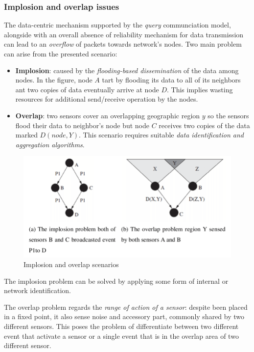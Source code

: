 \documentclass[10pt,a4paper]{report}
\theoremstyle{definition}
\begin{document}
\subsubsection{Implosion and overlap issues}\label{sec:implosion-and-overlap-issues}
The data-centric mechanism supported by the \textit{query} communciation model, alongside with an overall absence of reliability mechanism for data transmission can lead to an \textit{overflow} of packets towards network's nodes.
Two main problem can arise from the presented scenario:
\begin{itemize}
	\item 
	\textbf{Implosion}: caused by the \textit{flooding-based dissemination} of the data among nodes. In the figure, node $A$ tart by flooding its data to all of its neighbors ant two copies of data eventually arrive at node $D$. This implies wasting resources for additional send/receive operation by the nodes.
	\item 
	\textbf{Overlap}: two sensors cover an overlapping geographic region $y$ so the sensors flood their data to neighbor's node but node $C$ receives two copies of the data marked $D(node,Y)$. This scenario requires suitable \textit{data identification and aggregation algorithms}.
\end{itemize}
\begin{figure}[h]
	\centering\includegraphics[scale=0.50]{images/Pasted image 20230522191229.png}
	\caption{Implosion and overlap scenarios}
\end{figure}

The implosion problem can be solved by applying some form of internal or network identification.

The overlap problem regards the \textit{range of action of a sensor}: despite been placed in a fixed point, it also sense noise and accessory part, commonly shared by two different sensors.
This poses the problem of differentiate between two different event that activate a sensor or a single event that is in the overlap area of two different sensor.
\end{document}
